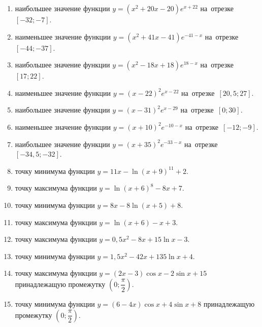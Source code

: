 \documentclass[a4paper,10pt]{article}
\begin{document}
\begin{enumerate}
\item {} наибольшее значение функции $y=\left(x^2 +20x -20\right)e^{x+22}$ на~отрезке~$\left[-32;-7\right]$.

\item {} наименьшее значение функции $y=\left(x^2 +41x -41\right)e^{-41-x}$ на~отрезке~$\left[-44;-37\right]$.

\item {} наибольшее значение функции $y=\left(x^2 -18x +18\right)e^{18-x}$ на~отрезке~$\left[17;22\right]$.

\item {} наименьшее значение функции $y=\left(x-22\right)^2e^{x-22}$ на~отрезке~$\left[20,5;27\right]$.

\item {} наибольшее значение функции $y=\left(x-31\right)^2e^{x-29}$ на~отрезке~$\left[0;30\right]$.

\item {} наименьшее значение функции $y=\left(x+10\right)^2e^{-10-x}$ на~отрезке~$\left[-12;-9\right]$.

\item {} наибольшее значение функции $y=\left(x+35\right)^2e^{-33-x}$ на~отрезке~$\left[-34,5;-32\right]$.

\item {} точку минимума функции $y=11x-\ln\left(x+9\right)^{11}+2$.

\item {} точку максимума функции $y=\ln\left(x+6\right)^{8}-8x+7$.

\item {} точку минимума функции $y=8x-8\ln\left(x+5\right)+8$.

\item {} точку максимума функции $y=\ln\left(x+6\right)-x+3$.

\item {} точку максимума функции $y=0,5x^2-8x+15\ln x -3$.

\item {} точку минимума функции $y=1,5x^2-42x+135\ln x +4$.

\item {} точку максимума функции $y=\left(2x-3\right)\cos x -2\sin x+15$
принадлежащую промежутку $\left(0;\dfrac{\pi}{2}\right)$.

\item {} точку минимума функции $y=\left(6-4x\right)\cos x +4\sin x+8$
принадлежащую промежутку $\left(0;\dfrac{\pi}{2}\right)$.


\end{enumerate}
\end{document}
